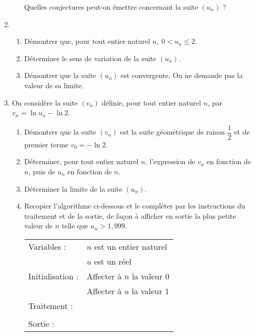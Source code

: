 \documentclass[10pt]{article}
\begin{document}
\begin{enumerate}
\begin{enumerate}
Quelles conjectures peut-on émettre concernant la suite $\left(u_{n}\right)$ ?
	\end{enumerate} 
\item
	\begin{enumerate}
		\item Démontrer que, pour tout entier naturel $n,\: 0 < u_{n} \leqslant 2$. 
		\item Déterminer le sens de variation de la suite $\left(u_{n}\right)$. 
		\item Démontrer que la suite $\left(u_{n}\right)$ est convergente. On ne demande pas la valeur de sa limite.
	\end{enumerate} 
\item On considère la suite $\left(v_{n}\right)$ définie, pour tout entier naturel $n$, par $v_{n} = \ln u_{n} - \ln 2$. 
	\begin{enumerate}
		\item Démontrer que la suite $\left(v_{n}\right)$ est la suite géométrique de raison $\dfrac{1}{2}$ et de premier terme  
$v_{0} = - \ln 2$. 
		\item Déterminer, pour tout entier naturel $n$, l'expression de $v_{n}$ en fonction de $n$, puis de $u_{n}$ en fonction de $n$. 
		\item Déterminer la limite de la suite $\left(u_{n}\right)$. 
		\item Recopier l'algorithme ci-dessous et le compléter par les instructions du traitement et de la sortie, de façon à afficher en sortie la plus petite valeur de $n$ telle que $u_{n} > 1,999$.
		
\begin{center}
\begin{tabular}{|l l|}\hline		 
Variables :		&$n$ est un entier naturel\\
				& $u$ est un réel\\
Initialisation :&Affecter à $n$ la valeur $0$\\
				&Affecter à $u$ la valeur 1\\ 
Traitement :	&\\
				&\\ 
Sortie :		&\\ \hline
\end{tabular}
\end{center}
	\end{enumerate} 
\end{enumerate}

\vspace{0,5cm}
\end{document}
